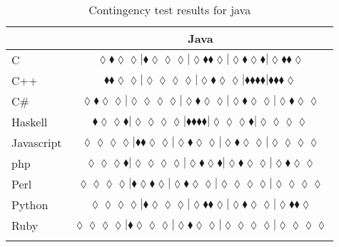 \begin{table*}
\centering
\begin{tabular}{l c}
& Java \\
\hline

C & $\scriptscriptstyle\lozenge\blacklozenge\lozenge\lozenge|\blacklozenge\lozenge\lozenge\lozenge|\lozenge\blacklozenge\blacklozenge\lozenge|\lozenge\blacklozenge\lozenge\blacklozenge|\lozenge\blacklozenge\blacklozenge\lozenge$ \\
C++ & $\scriptscriptstyle\blacklozenge\blacklozenge\lozenge\lozenge|\lozenge\lozenge\lozenge\lozenge|\lozenge\blacklozenge\lozenge\lozenge|\blacklozenge\blacklozenge\blacklozenge\blacklozenge|\blacklozenge\blacklozenge\blacklozenge\lozenge$ \\
C\# & $\scriptscriptstyle\lozenge\blacklozenge\lozenge\lozenge|\lozenge\lozenge\lozenge\lozenge|\lozenge\blacklozenge\lozenge\lozenge|\lozenge\blacklozenge\lozenge\lozenge|\lozenge\blacklozenge\lozenge\lozenge$ \\
Haskell & $\scriptscriptstyle\blacklozenge\lozenge\lozenge\blacklozenge|\lozenge\lozenge\lozenge\lozenge|\blacklozenge\blacklozenge\blacklozenge\blacklozenge|\lozenge\lozenge\lozenge\blacklozenge|\lozenge\lozenge\lozenge\lozenge$ \\
Javascript & $\scriptscriptstyle\lozenge\lozenge\lozenge\lozenge|\blacklozenge\blacklozenge\lozenge\lozenge|\lozenge\blacklozenge\lozenge\lozenge|\lozenge\blacklozenge\lozenge\lozenge|\lozenge\lozenge\lozenge\lozenge$ \\
{\sc php} & $\scriptscriptstyle\lozenge\lozenge\lozenge\blacklozenge|\lozenge\lozenge\lozenge\lozenge|\lozenge\blacklozenge\lozenge\blacklozenge|\lozenge\blacklozenge\lozenge\lozenge|\lozenge\blacklozenge\lozenge\lozenge$ \\
Perl & $\scriptscriptstyle\lozenge\lozenge\lozenge\lozenge|\blacklozenge\lozenge\blacklozenge\lozenge|\lozenge\blacklozenge\lozenge\lozenge|\lozenge\lozenge\lozenge\lozenge|\lozenge\lozenge\lozenge\lozenge$ \\
Python & $\scriptscriptstyle\lozenge\lozenge\lozenge\lozenge|\blacklozenge\lozenge\lozenge\lozenge|\lozenge\blacklozenge\blacklozenge\lozenge|\lozenge\blacklozenge\lozenge\lozenge|\lozenge\blacklozenge\blacklozenge\lozenge$ \\
Ruby & $\scriptscriptstyle\lozenge\lozenge\lozenge\lozenge|\blacklozenge\lozenge\lozenge\lozenge|\lozenge\blacklozenge\lozenge\lozenge|\lozenge\lozenge\lozenge\lozenge|\lozenge\lozenge\lozenge\lozenge$ \\

\hline
& \\
\end{tabular}
\caption{Contingency test results for java}
\label{tbl:contingency-test-results-java}
\end{table*}


